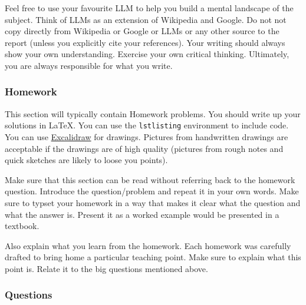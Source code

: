 \documentclass{article}
\theoremstyle{theorem}
\theoremstyle{definition}
\theoremstyle{remark}
\begin{document}
Feel free to use your favourite LLM to help you build a mental landscape of the subject. Think of LLMs as an extension of Wikipedia and Google. Do not not copy directly from Wikipedia or Google or LLMs or any other source to the report (unless you explicitly cite your references). Your writing should always show your own understanding. Exercise your own critical thinking.  Ultimately, you are always responsible for what you write. 

\subsubsection{Homework}

This section will typically contain Homework problems. You should write up your solutions in \LaTeX. You can use the \texttt{lstlisting} environment to include code. You can use \href{https://excalidraw.com/}{Excalidraw} for drawings. Pictures from handwritten drawings are acceptable if the drawings are of high quality (pictures from rough notes and quick sketches are likely to loose you points). 

Make sure that this section can be read without referring back to the homework question. Introduce the question/problem and repeat it in your own words. Make sure to typset your homework in a way that makes it clear what  the question and what the answer is. Present it as a worked example would be presented in a textbook. 

Also explain what you learn from the homework. Each homework was carefully drafted to bring home a particular teaching point. Make sure to explain what this point is. Relate it to the big questions mentioned above. 

%
%


\subsubsection{Questions}
\end{document}
